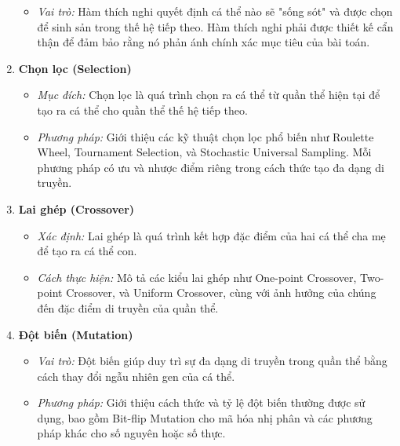 \documentclass[14pt]{article}
\begin{document}
\begin{enumerate}
\begin{itemize}
			\item \textit{Vai trò:} Hàm thích nghi quyết định cá thể nào sẽ "sống sót" và được chọn để sinh sản trong thế hệ tiếp theo. Hàm thích nghi phải được thiết kế cẩn thận để đảm bảo rằng nó phản ánh chính xác mục tiêu của bài toán.
		\end{itemize}
		\item \textbf{Chọn lọc (Selection)}
		\begin{itemize}
			\item \textit{Mục đích:} Chọn lọc là quá trình chọn ra cá thể từ quần thể hiện tại để tạo ra cá thể cho quần thể thế hệ tiếp theo.
			\item \textit{Phương pháp:} Giới thiệu các kỹ thuật chọn lọc phổ biến như Roulette Wheel, Tournament Selection, và Stochastic Universal Sampling. Mỗi phương pháp có ưu và nhược điểm riêng trong cách thức tạo đa dạng di truyền.
		\end{itemize}
		\item \textbf{Lai ghép (Crossover)}
		\begin{itemize}
			\item \textit{Xác định:} Lai ghép là quá trình kết hợp đặc điểm của hai cá thể cha mẹ để tạo ra cá thể con.
			\item \textit{Cách thực hiện:} Mô tả các kiểu lai ghép như One-point Crossover, Two-point Crossover, và Uniform Crossover, cùng với ảnh hưởng của chúng đến đặc điểm di truyền của quần thể.
		\end{itemize}
		\item \textbf{Đột biến (Mutation)}
		\begin{itemize}
			\item \textit{Vai trò:} Đột biến giúp duy trì sự đa dạng di truyền trong quần thể bằng cách thay đổi ngẫu nhiên gen của cá thể.
			\item \textit{Phương pháp:} Giới thiệu cách thức và tỷ lệ đột biến thường được sử dụng, bao gồm Bit-flip Mutation cho mã hóa nhị phân và các phương pháp khác cho số nguyên hoặc số thực.
		\end{itemize}
	\end{enumerate}
\end{document}
